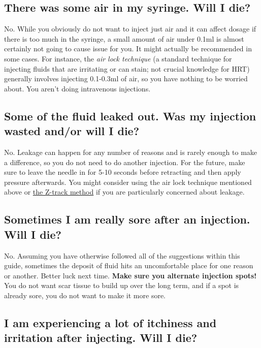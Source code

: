 \documentclass{article}
\begin{document}
\subsection{There was some air in my syringe. Will I die?}\label{7-7}

No. While you obviously do not want to inject just air and it can affect dosage if there is too much in the syringe, a small amount of air under 0.1ml is almost certainly not going to cause issue for you. It might actually be recommended in some cases. For instance, the \textit{air lock technique} (a standard technique for injecting fluids that are irritating or can stain; not crucial knowledge for HRT) generally involves injecting 0.1-0.3ml of air, so you have nothing to be worried about. You aren’t doing intravenous injections.

\subsection{Some of the fluid leaked out. Was my injection wasted and/or will I die?}

No. Leakage can happen for any number of reasons and is rarely enough to make a difference, so you do not need to do another injection. For the future, make sure to leave the needle in for 5-10 seconds before retracting and then apply pressure afterwards. You might consider using the air lock technique mentioned above or \href{https://www.nurse.com/nursing-resources/definitions/what-is-z-track-method/}{the Z-track method} if you are particularly concerned about leakage.

\subsection{Sometimes I am really sore after an injection. Will I die?}

No. Assuming you have otherwise followed all of the suggestions within this guide, sometimes the deposit of fluid hits an uncomfortable place for one reason or another. Better luck next time. \textbf{Make sure you alternate injection spots!} You do not want scar tissue to build up over the long term, and if a spot is already sore, you do not want to make it more sore.

\subsection{I am experiencing a lot of itchiness and irritation after injecting. Will I die?}
\end{document}
